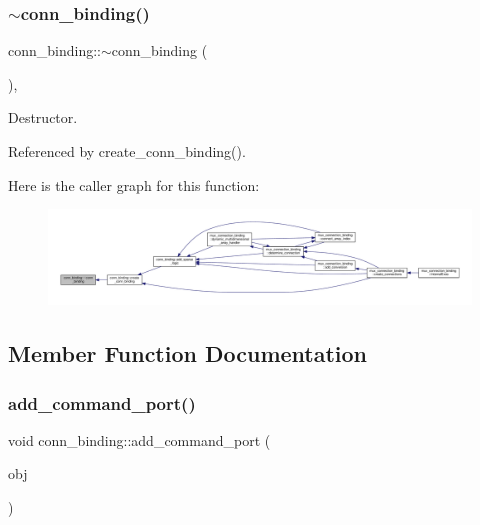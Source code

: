 \subsubsection{\texorpdfstring{$\sim$conn\+\_\+binding()}{~conn\_binding()}}
{\footnotesize\ttfamily conn\+\_\+binding\+::$\sim$conn\+\_\+binding (\begin{DoxyParamCaption}{ }\end{DoxyParamCaption})\hspace{0.3cm}{\ttfamily [virtual]}, {\ttfamily [default]}}



Destructor. 



Referenced by create\+\_\+conn\+\_\+binding().

Here is the caller graph for this function\+:
\nopagebreak
\begin{figure}[H]
\begin{center}
\leavevmode
\includegraphics[width=350pt]{d2/db1/classconn__binding_ae2443ca6da548b0dbbabbdc9253c4d1e_icgraph}
\end{center}
\end{figure}


\subsection{Member Function Documentation}
\mbox{\label{classconn__binding_a31cfcf41327aa36e1c1db32f175ef001}} 
\subsubsection{\texorpdfstring{add\+\_\+command\+\_\+port()}{add\_command\_port()}}
{\footnotesize\ttfamily void conn\+\_\+binding\+::add\+\_\+command\+\_\+port (\begin{DoxyParamCaption}\item[{const \hyperlink{generic__obj_8hpp_acb533b2ef8e0fe72e09a04d20904ca81}{generic\+\_\+obj\+Ref}}]{obj }\end{DoxyParamCaption})\hspace{0.3cm}{\ttfamily [inline]}}



